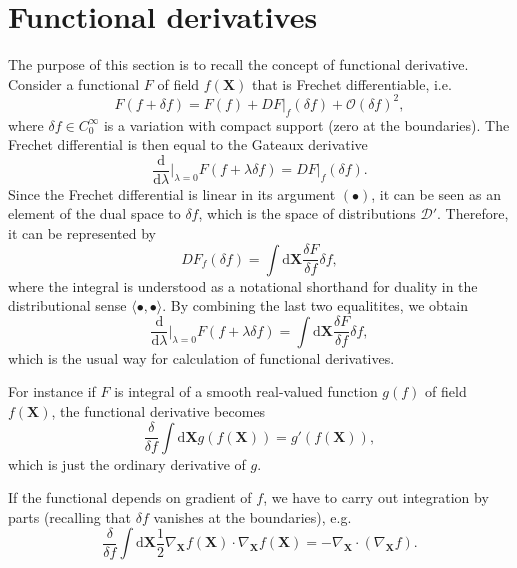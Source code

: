 \documentclass[
10pt, %
a4paper, %
oneside, %
headinclude,footinclude, %
BCOR5mm, %
]{scrartcl}
\newcommand{\XX}{\mathbf{X}}
\newcommand{\diff}{\mathrm{d}}
\newcommand{\dX}{\mathrm{d}\XX}
\newcommand{\OBig}{\mathcal{O}}
\begin{document}
\section{Functional derivatives}\label{sec.FD}
The purpose of this section is to recall the concept of functional derivative. Consider a functional $F$ of field $f(\XX)$ that is Frechet differentiable, i.e. 
\begin{equation}
	F(f+\delta f) = F(f) +  DF|_f (\delta f) + \OBig(\delta f)^2,
\end{equation}
where $\delta f \in C^\infty_0$ is a variation with compact support (zero at the boundaries).
The Frechet differential is then equal to the Gateaux derivative
\begin{equation}
	\frac{\diff}{\diff \lambda}\Big|_{\lambda = 0} F(f+\lambda \delta f) = DF|_f (\delta f).
\end{equation}
Since the Frechet differential is linear in its argument $(\bullet)$, it can be seen as an element of the dual space to $\delta f$, which is the space of distributions $\mathcal{D}'$. Therefore, it can be represented by 
\begin{equation}
	DF_f(\delta f) = \int\dX \frac{\delta F}{\delta f} \delta f,
\end{equation}
where the integral is understood as a notational shorthand for duality in the distributional sense $\langle\bullet,\bullet\rangle$. By combining the last two equalitites, we obtain
\begin{equation}
	\frac{\diff}{\diff \lambda}\Big|_{\lambda = 0} F(f+\lambda \delta f) 
	=  \int\dX \frac{\delta F}{\delta f} \delta f,
\end{equation}
which is the usual way for calculation of functional derivatives.

For instance if $F$ is integral of a smooth real-valued function $g(f)$ of field $f(\XX)$, the functional derivative becomes
\begin{equation}
	\frac{\delta}{\delta f}\int \dX g(f(\XX)) = g'(f(\XX)),
\end{equation}
which is just the ordinary derivative of $g$. 

If the functional depends on gradient of $f$, we have to carry out integration by parts (recalling that $\delta f$ vanishes at the boundaries), e.g.
\begin{equation}
	\frac{\delta}{\delta f}\int \dX \frac{1}{2}\nabla_\XX f(\XX) \cdot \nabla_\XX f(\XX) = -\nabla_\XX \cdot (\nabla_\XX f).
\end{equation}
\end{document}
